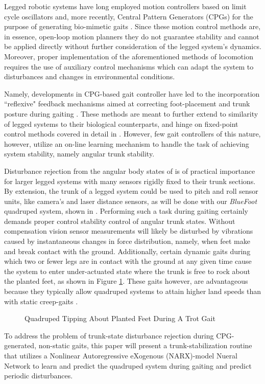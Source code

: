 
Legged robotic systems have long employed motion controllers based on limit cycle oscillators and, more recently, 
Central Pattern Generators (CPGs)  for the purpose of generating bio-mimetic gaits 
\cite{Matsuoka1985,Collins1993,Endo2004,Righetti2006,Ijspeert2008,Matos2010,Ajallooeian2013,Park2014,Fukuoka2015}. 
Since these motion control methods are, in essence, open-loop motion planners they do not guarantee stability and cannot 
be applied directly without further consideration of the legged system's dynamics. Moreover, proper implementation of 
the aforementioned methods of locomotion requires the use of auxiliary control mechanisms which can adapt the system 
to disturbances and changes in environmental conditions.

Namely, developments in CPG-based gait controller have led to the incorporation ``reflexive" feedback
mechanisms aimed at correcting foot-placement and trunk posture during gaiting \cite{Fukuoka2003,Endo2004}. These methods 
are meant to further extend to similarity of legged systems to their biological counterparts, and hinge on fixed-point control methods
covered in detail in \cite{Wieber2015}. However, few gait controllers of this nature, however, utilize an on-line learning mechanism 
to handle the task of achieving system stability, namely angular trunk stability.

Disturbance rejection from the angular body states of is of practical importance for larger legged systems with many sensors 
rigidly fixed to their trunk sections. By extension, the trunk of a legged system could be used to pitch and roll sensor units,
like camera's and laser distance sensors, as will be done with our \emph{BlueFoot} quadruped system, shown in \MissingFig. Performing
such a task during gaiting certainly demands proper control stability control of angular trunk states. Without compensation 
vision sensor measurements will likely be disturbed by vibrations caused by instantaneous changes in force distribution, namely, 
when feet make and break contact with the ground. Additionally, certain dynamic gaits during which two or fewer legs are in 
contact with the ground at any given time cause the system to enter under-actuated state where the trunk is free to rock 
about the planted feet, as shown in Figure \ref{fig::tipping_robot}.  These gaits however, are advantageous because they 
typically allow quadruped systems to attain higher land speeds than with static creep-gaits \MissingRef. 
	\begin{figure}[t!]
		\centering
		\caption{Quadruped Tipping About Planted Feet During A Trot Gait}
		\label{fig::tipping_robot}
	\end{figure}
To address the problem of trunk-state disturbance rejection during CPG-generated, non-static gaits, this paper will
present a trunk-stabilization routine that utilizes a Nonlinear Autoregressive eXogenous (NARX)-model Nueral Network 
to learn and predict the quadruped system  during gaiting and predict periodic disturbances.


